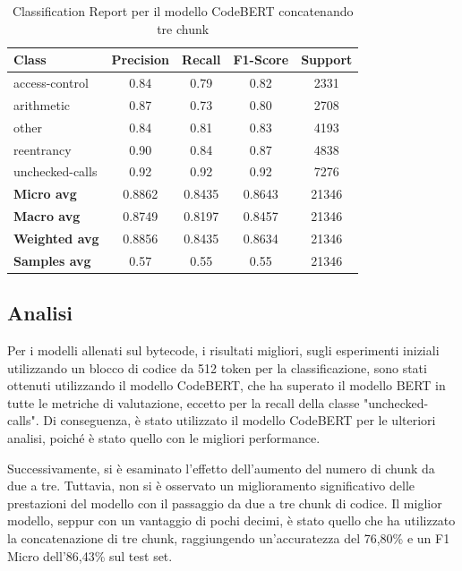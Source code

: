 \documentclass[../../Thesis.tex]{subfiles}
\begin{document}
\begin{table}[H]
    \centering
    \small
    \begin{tabular}{lcccc}
    \hline
    \textbf{Class} & \textbf{Precision} & \textbf{Recall} & \textbf{F1-Score} & \textbf{Support} \\
    \hline
    access-control & 0.84 & 0.79 & 0.82 & 2331 \\
    arithmetic & 0.87 & 0.73 & 0.80 & 2708 \\
    other & 0.84 & 0.81 & 0.83 & 4193 \\
    reentrancy & 0.90 & 0.84 & 0.87 & 4838 \\
    unchecked-calls & 0.92 & 0.92 & 0.92 & 7276 \\
    \hline
    \textbf{Micro avg} & 0.8862 & 0.8435 & 0.8643 & 21346 \\
    \textbf{Macro avg} & 0.8749 & 0.8197 & 0.8457 & 21346 \\
    \textbf{Weighted avg} & 0.8856 & 0.8435 & 0.8634 & 21346 \\
    \textbf{Samples avg} & 0.57 & 0.55 & 0.55 & 21346 \\
    \hline
    \end{tabular}
    \caption{Classification Report per il modello CodeBERT concatenando tre chunk}
\end{table}

\subsection{Analisi}
Per i modelli allenati sul bytecode, i risultati migliori, sugli esperimenti iniziali utilizzando un blocco di codice da 512 token per la classificazione, sono stati ottenuti utilizzando il modello CodeBERT, che ha superato il modello BERT in tutte le metriche di valutazione, eccetto per la recall della classe "unchecked-calls". Di conseguenza, è stato utilizzato il modello CodeBERT per le ulteriori analisi, poiché è stato quello con le migliori performance.

Successivamente, si è esaminato l'effetto dell'aumento del numero di chunk da due a tre. Tuttavia, non si è osservato un miglioramento significativo delle prestazioni del modello con il passaggio da due a tre chunk di codice. Il miglior modello, seppur con un vantaggio di pochi decimi, è stato quello che ha utilizzato la concatenazione di tre chunk, raggiungendo un'accuratezza del 76,80\% e un F1 Micro dell'86,43\% sul test set.
\end{document}
